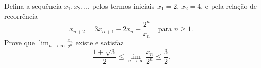 Defina a sequência \(x_1, x_2, \ldots\) pelos termos iniciais \(x_1 = 2\), \(x_2 = 4\), e pela relação de recorrência
\[
x_{n+2} = 3x_{n+1} - 2x_n + \frac{2^n}{x_n} \quad \text{para } n \ge 1.
\]
Prove que \(\displaystyle\lim_{n \to \infty} \frac{x_n}{2^n}\) existe e satisfaz
\[
\frac{1 + \sqrt{3}}{2} \le \lim_{n \to \infty} \frac{x_n}{2^n} \le \frac{3}{2}.
\]

